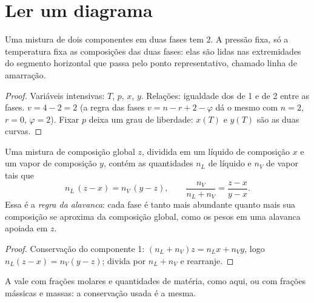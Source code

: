\section{Ler um diagrama}

\begin{proposition}\label{prop:b2:liquid-vapour-diagrams:variance}
Uma mistura de dois componentes em duas fases tem  2. A pressão fixa,
só a temperatura fixa as composições das duas fases: elas são lidas nas
extremidades do segmento horizontal que passa pelo ponto representativo,
chamado linha de amarração.
\end{proposition}

\begin{proof}
Variáveis intensivas: $T$, $p$, $x$, $y$. Relações: igualdade dos  de 1 e de 2 entre as fases. $v = 4 - 2 = 2$ (a regra das fases
$v = n - r + 2 - \varphi$ dá o mesmo com $n = 2$, $r = 0$, $\varphi = 2$).
Fixar $p$ deixa um grau de liberdade: $x(T)$ e $y(T)$ são as duas curvas.
\end{proof}

\begin{theorem}\label{thm:b2:liquid-vapour-diagrams:lever}
Uma mistura de composição global $z$, dividida em um líquido de composição $x$
e um vapor de composição $y$, contém as quantidades $n_L$ de líquido e $n_V$ de
vapor tais que
\[
  n_L\,(z - x) = n_V\,(y - z), \qquad \frac{n_V}{n_L + n_V} = \frac{z - x}{y - x} .
\]
Essa é a \emph{regra da alavanca}: cada fase é tanto mais
abundante quanto mais sua composição se aproxima da composição global, como os
pesos em uma alavanca apoiada em $z$.
\end{theorem}

\begin{proof}
Conservação do componente 1: $(n_L + n_V)z = n_Lx + n_Vy$, logo $n_L(z - x) =
n_V(y - z)$; divida por $n_L + n_V$ e rearranje.
\end{proof}

A  vale com frações molares e quantidades de matéria, como
aqui, ou com frações mássicas e massas: a conservação usada é a mesma.


